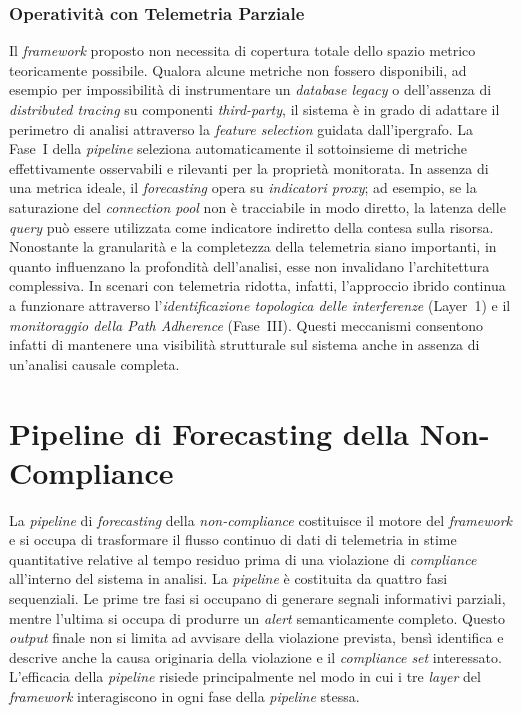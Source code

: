 \subsubsection{Operatività con Telemetria Parziale}
\label{sec:operativita_parziale}

Il \textit{framework} proposto non necessita di copertura totale dello spazio metrico teoricamente
possibile. Qualora alcune metriche non fossero disponibili, ad esempio per impossibilità di
instrumentare un \textit{database legacy} o dell'assenza di \textit{distributed tracing} su
componenti \textit{third-party}, il sistema è in grado di adattare il perimetro di analisi
attraverso la \textit{feature selection} guidata dall'ipergrafo. La Fase~I della
\textit{pipeline} seleziona automaticamente il sottoinsieme di metriche effettivamente osservabili
e rilevanti per la proprietà monitorata. In assenza di una metrica ideale, il \textit{forecasting}
opera su \textit{indicatori proxy}; ad esempio, se la saturazione del \textit{connection pool} non
è tracciabile in modo diretto, la latenza delle \textit{query} può essere utilizzata come
indicatore indiretto della contesa sulla risorsa. Nonostante la granularità e la completezza della
telemetria siano importanti, in quanto influenzano la profondità dell'analisi, esse non invalidano
l'architettura complessiva. In scenari con telemetria ridotta, infatti, l'approccio ibrido
continua a funzionare attraverso l'\textit{identificazione topologica delle interferenze}
(Layer~1) e il \textit{monitoraggio della Path Adherence} (Fase~III). Questi meccanismi consentono
infatti di mantenere una visibilità strutturale sul sistema anche in assenza di un'analisi causale
completa.

\section{Pipeline di Forecasting della Non-Compliance}
\label{sec:pipeline_forecasting}

La \textit{pipeline} di \textit{forecasting} della \textit{non-compliance} costituisce il motore
del \textit{framework} e si occupa di trasformare il flusso continuo di dati di telemetria in
stime quantitative relative al tempo residuo prima di una violazione di \textit{compliance}
all'interno del sistema in analisi. La \textit{pipeline} è costituita da quattro fasi sequenziali.
Le prime tre fasi si occupano di generare segnali informativi parziali, mentre l'ultima si occupa
di produrre un \textit{alert} semanticamente completo. Questo \textit{output} finale non si limita
ad avvisare della violazione prevista, bensì identifica e descrive anche la causa originaria della
violazione e il \textit{compliance set} interessato. L'efficacia della \textit{pipeline} risiede
principalmente nel modo in cui i tre \textit{layer} del \textit{framework} interagiscono in ogni
fase della \textit{pipeline} stessa.

